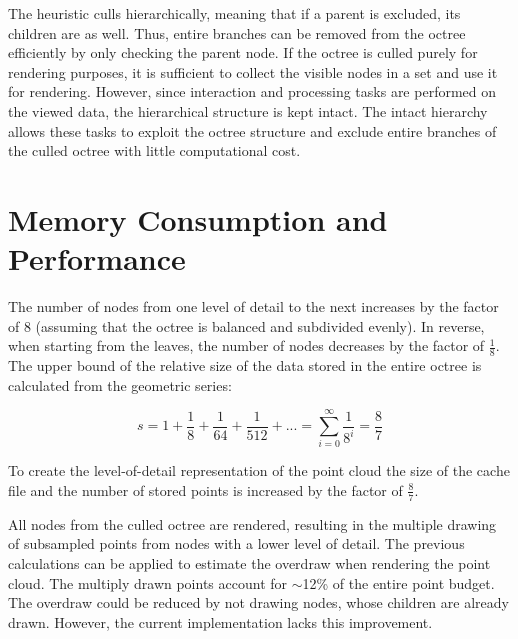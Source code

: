 \par

The heuristic culls hierarchically, meaning that if a parent is excluded, its children are as well. Thus, entire branches can be removed from the octree efficiently by only checking the parent node. If the octree is culled purely for rendering purposes, it is sufficient to collect the visible nodes in a set and use it for rendering. However, since interaction and processing tasks are performed on the viewed data, the hierarchical structure is kept intact. The intact hierarchy allows these tasks to exploit the octree structure and exclude entire branches of the culled octree with little computational cost. 


\section{Memory Consumption and Performance}
\label{sec:octree_memory}

The number of nodes from one level of detail to the next increases by the factor of $8$ (assuming that the octree is balanced and subdivided evenly). In reverse, when starting from the leaves, the number of nodes decreases by the factor of $\frac{1}{8}$. The upper bound of the relative size of the data stored in the entire octree is calculated from the geometric series: 


$$s = 1 + \frac{1}{8} + \frac{1}{64} + \frac{1}{512} + ... = \sum_{i = 0}^{\infty}{\frac{1}{8^i}} = \frac{8}{7}$$


To create the level-of-detail representation of the point cloud the size of the cache file and the number of stored points is increased by the factor of $\frac{8}{7}$. 

\par

All nodes from the culled octree are rendered, resulting in the multiple drawing of subsampled points from nodes with a lower level of detail. The previous calculations can be applied to estimate the overdraw when rendering the point cloud. The multiply drawn points account for $\sim$12\% of the entire point budget. The overdraw could be reduced by not drawing nodes, whose children are already drawn. However, the current implementation lacks this improvement. 
